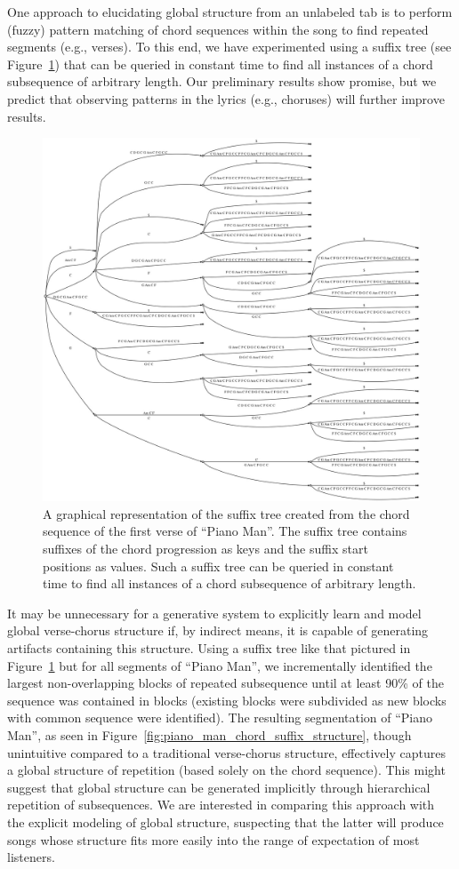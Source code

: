 \documentclass[11pt,phd]{byuprop}
\begin{document}
One approach to elucidating global structure from an unlabeled tab is to perform (fuzzy) pattern matching of chord sequences within the song to find repeated segments (e.g., verses). To this end, we have experimented using a suffix tree (see Figure~\ref{fig:suffix_tree_piano_man}) that can be queried in constant time to find all instances of a chord subsequence of arbitrary length. Our preliminary results show promise, but we predict that observing patterns in the lyrics (e.g., choruses) will further improve results. 

\begin{figure}
  \centering
  \includegraphics[width=.5\textwidth]{graphics/suffix_tree_piano_man.jpg}
  \caption{A graphical representation of the suffix tree created from the chord sequence of the first verse of ``Piano Man''. The suffix tree contains suffixes of the chord progression as keys and the suffix start positions as values. Such a suffix tree can be queried in constant time to find all instances of a chord subsequence of arbitrary length.}
    \label{fig:suffix_tree_piano_man}
\end{figure}

It may be unnecessary for a generative system to explicitly learn and model global verse-chorus structure if, by indirect means, it is capable of generating artifacts containing this structure. Using a suffix tree like that pictured in Figure~\ref{fig:suffix_tree_piano_man} but for all segments of ``Piano Man'', we incrementally identified the largest non-overlapping blocks of repeated subsequence until at least 90\% of the sequence was contained in blocks (existing blocks were subdivided as new blocks with common sequence were identified). The resulting segmentation of ``Piano Man'', as seen in Figure~\ref{fig:piano_man_chord_suffix_structure}, though unintuitive compared to a traditional verse-chorus structure, effectively captures a global structure of repetition (based solely on the chord sequence). This might suggest that global structure can be generated implicitly through hierarchical repetition of subsequences. We are interested in comparing this approach with the explicit modeling of global structure, suspecting that the latter will produce songs whose structure fits more easily into the range of expectation of most listeners.
\end{document}
